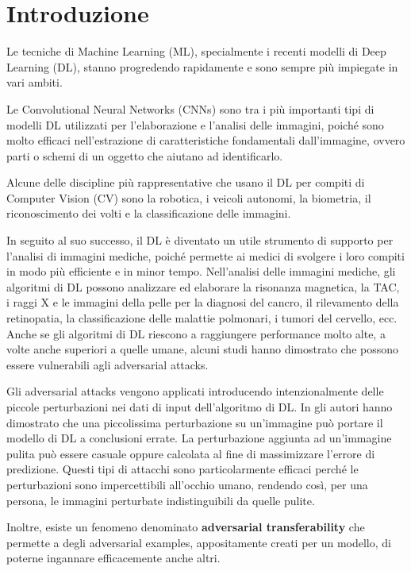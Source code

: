 \chapter{Introduzione}
\label{chap:1}

Le tecniche di Machine Learning (ML), specialmente i recenti modelli di Deep Learning (DL), stanno progredendo rapidamente e sono sempre più impiegate in vari ambiti.

Le Convolutional Neural Networks (CNNs) sono tra i più importanti tipi di modelli DL utilizzati per l'elaborazione e l'analisi delle immagini, poiché sono molto efficaci nell'estrazione di caratteristiche fondamentali dall'immagine, ovvero parti o schemi di un oggetto che aiutano ad identificarlo.

Alcune delle discipline più rappresentative che usano il DL per compiti di Computer Vision (CV) sono la robotica, i veicoli autonomi, la biometria, il riconoscimento dei volti e la classificazione delle immagini.

In seguito al suo successo, il DL è diventato un utile strumento di supporto per l'analisi di immagini mediche, poiché permette ai medici di svolgere i loro compiti in modo più efficiente e in minor tempo.
Nell'analisi delle immagini mediche, gli algoritmi di DL possono analizzare ed elaborare la risonanza magnetica, la TAC, i raggi X e le immagini della pelle per la diagnosi del cancro, il rilevamento della retinopatia, la classificazione delle malattie polmonari, i tumori del cervello, ecc.
Anche se gli algoritmi di DL riescono a raggiungere performance molto alte, a volte anche superiori a quelle umane, alcuni studi hanno dimostrato che possono essere vulnerabili agli adversarial attacks. 

Gli adversarial attacks vengono applicati introducendo intenzionalmente delle piccole perturbazioni nei dati di input dell'algoritmo di DL. 
In %
\cite{szegedy2013intriguing} gli autori hanno dimostrato che una piccolissima perturbazione su un'immagine può portare il modello di DL a conclusioni errate. 
La perturbazione aggiunta ad un'immagine pulita può essere casuale oppure calcolata al fine di massimizzare l'errore di predizione. 
Questi tipi di attacchi sono particolarmente efficaci perché le perturbazioni sono impercettibili all'occhio umano, rendendo così, per una persona, le immagini perturbate indistinguibili da quelle pulite.

Inoltre, esiste un fenomeno denominato \textbf{adversarial transferability} %
\cite{papernot2016transferability} che permette a degli adversarial examples, appositamente creati per un modello, di poterne ingannare efficacemente anche altri.

